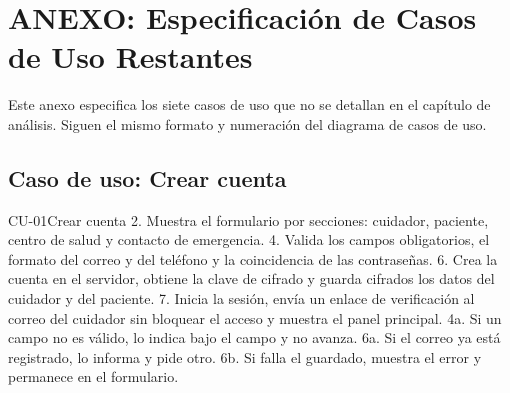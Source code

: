 \chapter[Anexo: Especificación de Casos de Uso Restantes]{ANEXO: Especificación de Casos de Uso Restantes}

Este anexo especifica los siete casos de uso que no se detallan en el capítulo de
análisis. Siguen el mismo formato y numeración del diagrama de casos de uso.

\section*{Caso de uso: Crear cuenta}

\begin{table}[H]
\centering
\caption{Especificación del caso de uso CU-01.}
\label{tab:cu-01}
\begin{especificacioncu}{CU-01}{Crear cuenta}
           {2. Muestra el formulario por secciones: cuidador, paciente, centro de salud y contacto de emergencia.}
           {4. Valida los campos obligatorios, el formato del correo y del teléfono y la coincidencia de las contraseñas.}
           {6. Crea la cuenta en el servidor, obtiene la clave de cifrado y guarda cifrados los datos del cuidador y del paciente.}
    \cupaso{}
           {7. Inicia la sesión, envía un enlace de verificación al correo del cuidador sin bloquear el acceso y muestra el panel principal.}
    \cufinflujo
    \cupaso{}
           {4a. Si un campo no es válido, lo indica bajo el campo y no avanza.}
    \cupaso{}
           {6a. Si el correo ya está registrado, lo informa y pide otro.}
    \cupaso{}
           {6b. Si falla el guardado, muestra el error y permanece en el formulario.}
    \cufinflujo
\end{especificacioncu}
\end{table}

